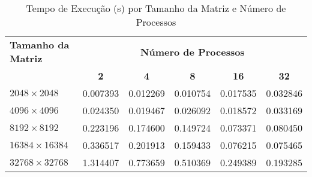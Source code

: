\documentclass[a4paper, 12pt]{article}
\begin{document}
	
	\begin{table}[h!]
		\centering
		\caption{Tempo de Execução (s) por Tamanho da Matriz e Número de Processos}
		\label{tab:execution_times_simple}
		\begin{tabular}{|l|c|c|c|c|c|}
			\hline
			\textbf{Tamanho da Matriz} & \multicolumn{5}{c|}{\textbf{Número de Processos}} \\
			\cline{2-6}
			& \textbf{2} & \textbf{4} & \textbf{8} & \textbf{16} & \textbf{32} \\
			\hline
			$2048 \times 2048$        & 0.007393   & 0.012269   & 0.010754   & 0.017535    & 0.032846    \\ %
			\hline
			$4096 \times 4096$        & 0.024350   & 0.019467   & 0.026092   & 0.018572    & 0.033169    \\ %
			\hline
			$8192 \times 8192$        & 0.223196   & 0.174600   & 0.149724   & 0.073371    & 0.080450    \\ %
			\hline
			$16384 \times 16384$      & 0.336517   & 0.201913   & 0.159433   & 0.076215    & 0.075465    \\ %
			\hline
			$32768 \times 32768$      & 1.314407   & 0.773659   & 0.510369   & 0.249389    & 0.193285    \\ %
			\hline
		\end{tabular}
	\end{table}
	
\end{document}
